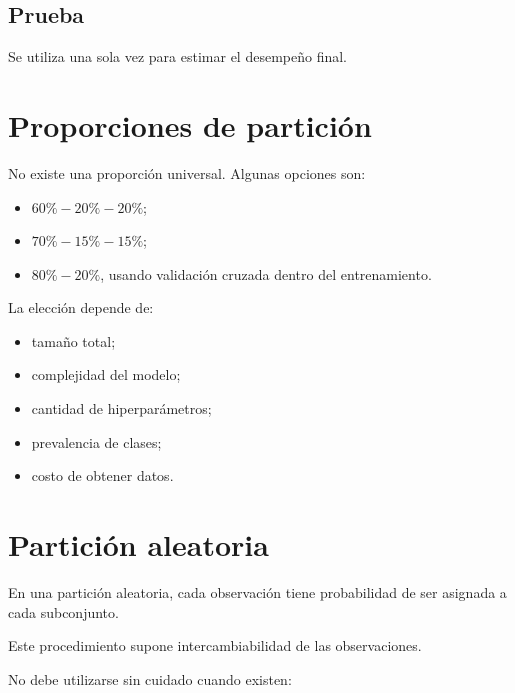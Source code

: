 \documentclass[
  spanish,
  10.5pt,
  letterpaper,
  DIV=11,
  numbers=noendperiod,
  oneside,
  open=any]{scrreprt}
\providecommand{\tightlist}{%
  \setlength{\itemsep}{0pt}\setlength{\parskip}{0pt}}
\theoremstyle{definition}
\theoremstyle{definition}
\theoremstyle{plain}
\theoremstyle{remark}
\begin{document}
\subsection*{Prueba}\label{prueba}

Se utiliza una sola vez para estimar el desempeño final.

\section*{Proporciones de partición}\label{proporciones-de-particiuxf3n}


No existe una proporción universal. Algunas opciones son:

\begin{itemize}
\tightlist
\item
  \(60\%-20\%-20\%\);
\item
  \(70\%-15\%-15\%\);
\item
  \(80\%-20\%\), usando validación cruzada dentro del entrenamiento.
\end{itemize}

La elección depende de:

\begin{itemize}
\tightlist
\item
  tamaño total;
\item
  complejidad del modelo;
\item
  cantidad de hiperparámetros;
\item
  prevalencia de clases;
\item
  costo de obtener datos.
\end{itemize}

\section*{Partición aleatoria}\label{particiuxf3n-aleatoria}


En una partición aleatoria, cada observación tiene probabilidad de ser
asignada a cada subconjunto.

Este procedimiento supone intercambiabilidad de las observaciones.

No debe utilizarse sin cuidado cuando existen:
\end{document}
